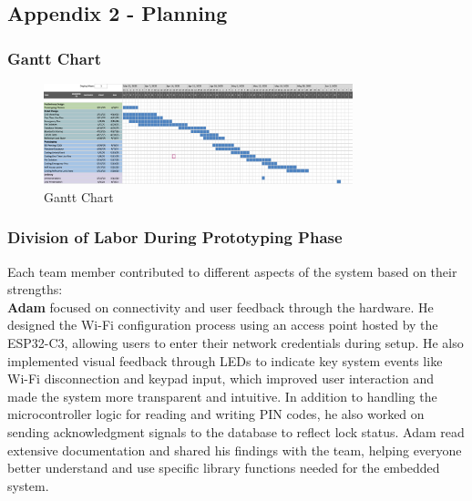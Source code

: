 
\newpage

    \subsection{Appendix 2 - Planning}
    \subsubsection{Gantt Chart}

    \begin{figure}[!ht]
    \centering
    \includegraphics[width=0.80\textwidth]{img/ganttchart.png}
    \caption{Gantt Chart}
    \label{fig:ganttchart}
\end{figure}

\subsubsection{Division of Labor During Prototyping Phase}

Each team member contributed to different aspects of the system based on their strengths: \\

\textbf{Adam} focused on connectivity and user feedback through the hardware. He designed the Wi-Fi configuration process using an access point hosted by the ESP32-C3, allowing users to enter their network credentials during setup. He also implemented visual feedback through LEDs to indicate key system events like Wi-Fi disconnection and keypad input, which improved user interaction and made the system more transparent and intuitive. In addition to handling the microcontroller logic for reading and writing PIN codes, he also worked on sending acknowledgment signals to the database to reflect lock status. Adam read extensive documentation and shared his findings with the team, helping everyone better understand and use specific library functions needed for the embedded system. \\

